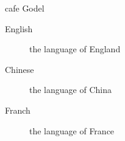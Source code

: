 \documentclass{article}
\begin{document}
    cafe \qquad Godel

    \begin{description}
        \item[English] the language of England
        \item[Chinese] the language of China
        \item[Franch] the language of France   
    \end{description}
\end{document}
